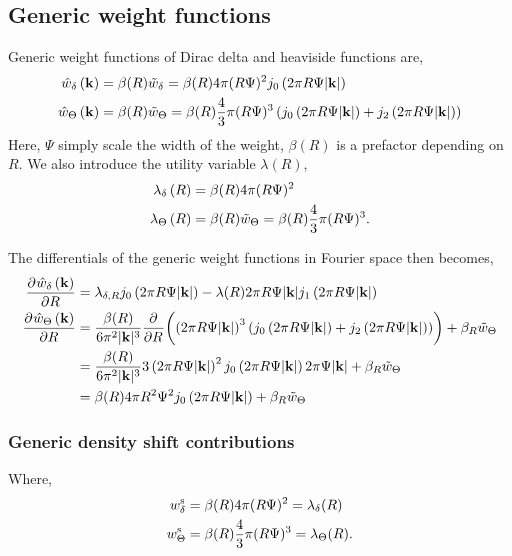 \documentclass[12pt, letterpaper]{article}
\newcommand*{\pd}[3][]{\frac{\partial^{#1}#2}{\partial{#3}^{#1}}}%
\newcommand*{\lb}{\ensuremath{\left(}}
\newcommand*{\rb}{\ensuremath{\right)}}
\begin{document}
\subsection{Generic weight functions}
Generic weight functions of Dirac delta and heaviside functions are,
\begin{align}
  \label{eq:generic_weight_functions_fourier}
  \hat{w}_\delta \lb \mathbf{k}\rb &=  \beta(R) \tilde{w}_\delta = \beta(R) 4 \pi (R \Psi)^2 j_0\lb 2 \pi R \Psi |\mathbf{k}| \rb \\
  \hat{w}_\Theta \lb \mathbf{k}\rb &=  \beta(R) \tilde{w}_\Theta = \beta(R) \frac{4}{3} \pi (R\Psi)^3 \lb j_0\lb 2 \pi R\Psi |\mathbf{k}| \rb + j_2\lb 2 \pi R\Psi |\mathbf{k}| \rb \rb  \\
\end{align}
Here, $\Psi$ simply scale the width of the weight, $\beta(R)$ is a
prefactor depending on $R$. We also introduce the utility variable
$\lambda(R)$,
\begin{align}
  \label{eq:lambdas}
  \lambda_\delta \lb R \rb &=  \beta(R) 4 \pi (R \Psi)^2  \\
  \lambda_\Theta  \lb R \rb &=  \beta(R) \tilde{w}_\Theta = \beta(R) \frac{4}{3} \pi (R\Psi)^3.
\end{align}

The differentials of the generic weight functions in Fourier space then becomes,
\begin{align}
  \label{eq:generic_weight_functions_fourier_diff}
  \pd{\hat{w}_\delta \lb \mathbf{k}\rb}{R} &=  \lambda_{\delta,R} j_0\lb 2 \pi R \Psi |\mathbf{k}| \rb - \lambda(R) 2 \pi R \Psi |\mathbf{k}| j_1\lb 2 \pi R \Psi |\mathbf{k}| \rb  \\
  \pd{\hat{w}_\Theta \lb \mathbf{k}\rb}{R}  &=  \frac{\beta(R)}{6 \pi^2 |\mathbf{k}|^3} \pd{}{R}\biggl( \lb 2 \pi R \Psi |\mathbf{k}|\rb ^3 \lb j_0\lb 2 \pi R \Psi |\mathbf{k}| \rb + j_2\lb 2 \pi R \Psi |\mathbf{k}| \rb \rb \biggr) + \beta_R \tilde{w}_\Theta  \nonumber \\
                                           &=  \frac{\beta(R)}{6 \pi^2 |\mathbf{k}|^3} 3 \lb 2 \pi R \Psi |\mathbf{k}|\rb ^2  j_0\lb 2 \pi R \Psi |\mathbf{k}| \rb 2 \pi \Psi |\mathbf{k}| + \beta_R \tilde{w}_\Theta \nonumber  \\
                                           &=  \beta(R) 4 \pi R^2 \Psi^2 j_0\lb 2 \pi R \Psi |\mathbf{k}| \rb + \beta_R \tilde{w}_\Theta
\end{align}


\subsubsection{Generic density shift contributions}
Where,
\begin{align}
  \label{eq:generic_weight_functions_steady}
  w_\delta^{\rm{s}} &= \beta(R) 4 \pi (R \Psi)^2 = \lambda_\delta(R)  \\
  w_\Theta^{\rm{s}} &= \beta(R) \frac{4}{3} \pi (R \Psi)^3 = \lambda_\Theta(R).
\end{align}
\end{document}
